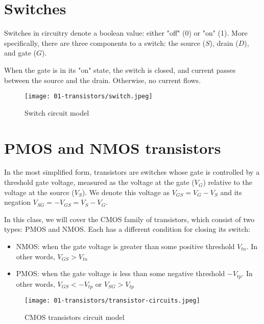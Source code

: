 \documentclass[11pt]{article}
\begin{document}
\maketitle
\tableofcontents
\newpage

\section{Switches}

Switches in circuitry denote a boolean value: either "off" (0) or "on" (1). More specifically, there are three components to a switch: the source ($S$), drain ($D$), and gate ($G$).

When the gate is in its "on" state, the switch is closed, and current passes between the source and the drain. Otherwise, no current flows. 

\begin{figure}[H]
    \centering
        \texttt{[image: 01-transistors/switch.jpeg]}
    \caption{Switch circuit model}
\end{figure}

\section{PMOS and NMOS transistors}

In the most simplified form, transistors are switches whose gate is controlled by a threshold gate voltage, measured as the voltage at the gate ($V_G$) relative to the voltage at the source ($V_S$). We denote this voltage as $V_{GS}=V_G-V_S$ and its negation $V_{SG}=-V_{GS}=V_S-V_G$.

In this class, we will cover the CMOS family of transistors, which consist of two types: PMOS and NMOS. Each has a different condition for closing its switch:
\begin{itemize}
    \item NMOS: when the gate voltage is greater than some positive threshold $V_{tn}$. In other words, $V_{GS}>V_{tn}$
    \item PMOS: when the gate voltage is less than some negative threshold $-V_{tp}$. In other words, $V_{GS}<-V_{tp}$ or $V_{SG}>V_{tp}$
\end{itemize}

\begin{figure}[H]
    \centering
        \texttt{[image: 01-transistors/transistor-circuits.jpeg]}
    \caption{CMOS transistors circuit model}
\end{figure}
\end{document}
